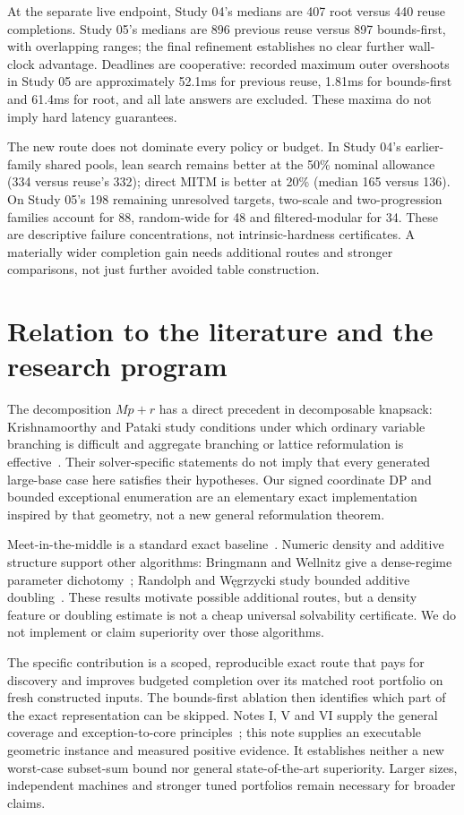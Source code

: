 \documentclass[10pt,english]{article}
\begin{document}
At the separate live endpoint, Study 04's medians are 407 root versus 440 reuse completions. Study 05's medians are 896 previous reuse versus 897 bounds-first, with overlapping ranges; the final refinement establishes no clear further wall-clock advantage. Deadlines are cooperative: recorded maximum outer overshoots in Study 05 are approximately 52.1ms for previous reuse, 1.81ms for bounds-first and 61.4ms for root, and all late answers are excluded. These maxima do not imply hard latency guarantees.

The new route does not dominate every policy or budget. In Study 04's earlier-family shared pools, lean search remains better at the 50\% nominal allowance (334 versus reuse's 332); direct MITM is better at 20\% (median 165 versus 136). On Study 05's 198 remaining unresolved targets, two-scale and two-progression families account for 88, random-wide for 48 and filtered-modular for 34. These are descriptive failure concentrations, not intrinsic-hardness certificates. A materially wider completion gain needs additional routes and stronger comparisons, not just further avoided table construction.

\section{Relation to the literature and the research program}
The decomposition $Mp+r$ has a direct precedent in decomposable knapsack: Krishnamoorthy and Pataki study conditions under which ordinary variable branching is difficult and aggregate branching or lattice reformulation is effective~\cite{kp}. Their solver-specific statements do not imply that every generated large-base case here satisfies their hypotheses. Our signed coordinate DP and bounded exceptional enumeration are an elementary exact implementation inspired by that geometry, not a new general reformulation theorem.

Meet-in-the-middle is a standard exact baseline~\cite{hs}. Numeric density and additive structure support other algorithms: Bringmann and Wellnitz give a dense-regime parameter dichotomy~\cite{dense}; Randolph and W\k{e}grzycki study bounded additive doubling~\cite{doubling}. These results motivate possible additional routes, but a density feature or doubling estimate is not a cheap universal solvability certificate. We do not implement or claim superiority over those algorithms.

The specific contribution is a scoped, reproducible exact route that pays for discovery and improves budgeted completion over its matched root portfolio on fresh constructed inputs. The bounds-first ablation then identifies which part of the exact representation can be skipped. Notes I, V and VI supply the general coverage and exception-to-core principles~\cite{note1,note5,note6}; this note supplies an executable geometric instance and measured positive evidence. It establishes neither a new worst-case subset-sum bound nor general state-of-the-art superiority. Larger sizes, independent machines and stronger tuned portfolios remain necessary for broader claims.
\end{document}

